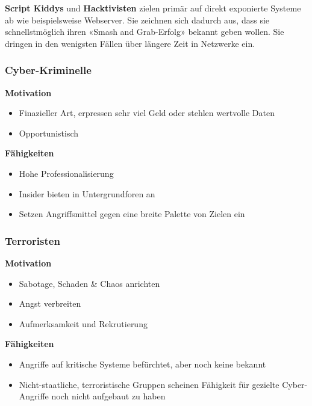 \textbf{Script Kiddys} und \textbf{Hacktivisten} zielen primär auf direkt exponierte Systeme ab wie beispielsweise Webserver. Sie zeichnen sich dadurch aus, dass sie schnellstmöglich ihren «Smash and Grab-Erfolg» bekannt geben
wollen. Sie dringen in den wenigsten Fällen über längere Zeit in Netzwerke ein.

\subsubsection{Cyber-Kriminelle}

\begin{minipage}{0.5\linewidth}
    \textbf{Motivation}
    \begin{itemize}
        \item Finazieller Art, erpressen sehr viel Geld oder stehlen wertvolle Daten
        \item Opportunistisch
    \end{itemize}
\end{minipage}
\begin{minipage}{0.45\linewidth}
    \textbf{Fähigkeiten}\\
    \begin{itemize}
        \item Hohe Professionalisierung
        \item Insider bieten in Untergrundforen an
        \item Setzen Angriffsmittel gegen eine breite Palette von Zielen ein
    \end{itemize}
\end{minipage}


\subsubsection{Terroristen}
\begin{minipage}{0.5\linewidth}
    \textbf{Motivation}
    \begin{itemize}
        \item Sabotage, Schaden \& Chaos anrichten
        \item Angst verbreiten
        \item Aufmerksamkeit und Rekrutierung
    \end{itemize}
\end{minipage}
\begin{minipage}{0.45\linewidth}
    \textbf{Fähigkeiten}\\
    \begin{itemize}
        \item Angriffe auf kritische Systeme befürchtet, aber noch keine bekannt
        \item Nicht-staatliche, terroristische Gruppen scheinen Fähigkeit für gezielte Cyber-Angriffe noch nicht aufgebaut zu haben\\
    \end{itemize}
\end{minipage}


